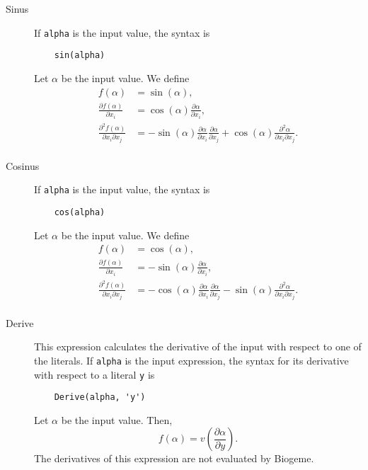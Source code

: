 \documentclass[12pt,a4paper]{article}
\begin{document}
\begin{description}
 \item[Sinus] If \lstinline+alpha+ is the input value, the syntax is
  \begin{lstlisting}
    sin(alpha)
  \end{lstlisting}
  Let $\alpha$ be the input value. We define
  \begin{align*}
      f(\alpha) &= \sin(\alpha), \\
      \frac{\partial f(\alpha)}{\partial x_i} &= \cos(\alpha) \frac{\partial \alpha}{\partial x_i},\\
      \frac{\partial^2 f(\alpha)}{\partial x_i\partial x_j} &= -\sin(\alpha)\frac{\partial \alpha}{\partial x_i}\frac{\partial \alpha}{\partial x_j} + \cos(\alpha)\frac{\partial^2 \alpha}{\partial x_i\partial x_j}.\\
  \end{align*}

 \item[Cosinus] If \lstinline+alpha+ is the input value, the syntax is
  \begin{lstlisting}
    cos(alpha)
  \end{lstlisting}
  Let $\alpha$ be the input value. We define
  \begin{align*}
      f(\alpha) &= \cos(\alpha), \\
      \frac{\partial f(\alpha)}{\partial x_i} &= -\sin(\alpha) \frac{\partial \alpha}{\partial x_i},\\
      \frac{\partial^2 f(\alpha)}{\partial x_i\partial x_j} &= -\cos(\alpha) \frac{\partial \alpha}{\partial x_i} \frac{\partial \alpha}{\partial x_j}- \sin(\alpha)\frac{\partial^2 \alpha}{\partial x_i\partial x_j}.\\
  \end{align*}
    
\item[Derive] This expression calculates the derivative of the input
  with respect to one of the literals. If \lstinline+alpha+ is the
  input expression, the syntax for its derivative with respect to a
  literal \lstinline+y+ is
  \begin{lstlisting}
    Derive(alpha, 'y')
  \end{lstlisting}
  Let $\alpha$ be the input value. Then,
  \[
  f(\alpha) = v\left(\frac{\partial \alpha}{\partial y}\right).
  \]
  The derivatives of this expression are not evaluated by Biogeme.


\end{description}
\end{document}

